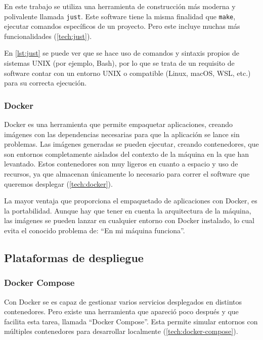 En este trabajo se utiliza una herramienta de construcción más moderna y polivalente llamada \texttt{just}\cite{just}. Este software tiene la misma finalidad que \texttt{make}, ejecutar comandos específicos de un proyecto. Pero este incluye muchas más funcionalidades (\ref{tech:just}).

En \ref{lst:just} se puede ver que se hace uso de comandos y sintaxis propios de sistemas UNIX (por ejemplo, Bash), por lo que se trata de un requisito de software contar con un entorno UNIX o compatible (Linux, macOS, WSL, etc.) para su correcta ejecución.

\subsubsection*{Docker}
\label{subsec:docker}

Docker\cite{docker} es una herramienta que permite empaquetar aplicaciones, creando imágenes con las dependencias necesarias para que la aplicación se lance sin problemas. Las imágenes generadas se pueden ejecutar, creando contenedores, que son entornos completamente aislados del contexto de la máquina en la que han levantado. Estos contenedores son muy ligeros en cuanto a espacio y uso de recursos, ya que almacenan únicamente lo necesario para correr el software que queremos desplegar (\ref{tech:docker}).

La mayor ventaja que proporciona el empaquetado de aplicaciones con Docker, es la portabilidad. Aunque hay que tener en cuenta la arquitectura de la máquina, las imágenes se pueden lanzar en cualquier entorno con Docker instalado, lo cual evita el conocido problema de: ``En mi máquina funciona''.

\subsection*{Plataformas de despliegue}

\subsubsection*{Docker Compose}
\label{subsec:docker-compose}

Con Docker se es capaz de gestionar varios servicios desplegados en distintos contenedores. Pero existe una herramienta que apareció poco después y que facilita esta tarea, llamada ``Docker Compose''\cite{docker-compose}. Esta permite simular entornos con múltiples contenedores para desarrollar localmente (\ref{tech:docker-compose}).

